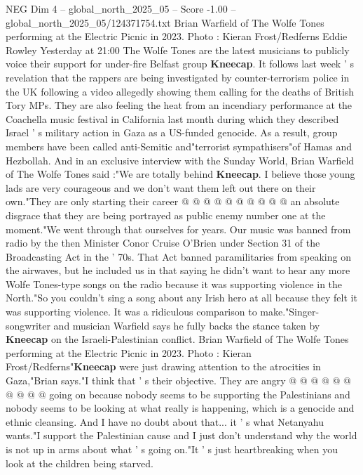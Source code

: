 \begin{textsample}{NEG Dim 4 – global\_north\_2025\_05 – Score -1.00 – global\_north\_2025\_05/124371754.txt}  \label{ex:f4_neg_263}
Brian Warfield of The Wolfe Tones performing at the Electric Picnic in 2023.
Photo : Kieran Frost/Redferns Eddie Rowley Yesterday at 21:00 The Wolfe Tones are the latest musicians to publicly voice their support for under-fire Belfast group \textbf{Kneecap}.
It follows last week ' s revelation that the rappers are being investigated by counter-terrorism police in the UK following a video allegedly showing them calling for the deaths of British Tory MPs.
They are also feeling the heat from an incendiary performance at the Coachella music festival in California last month during which they described Israel ' s military action in Gaza as a US-funded genocide.
As a result, group members have been called anti-Semitic and"terrorist sympathisers"of Hamas and Hezbollah.
And in an exclusive interview with the Sunday World, Brian Warfield of The Wolfe Tones said :"We are totally behind \textbf{Kneecap}.
I believe those young lads are very courageous and we don't want them left out there on their own."They are only starting their career @ @ @ @ @ @ @ @ @ @ an absolute disgrace that they are being portrayed as public enemy number one at the moment."We went through that ourselves for years.
Our music was banned from radio by the then Minister Conor Cruise O'Brien under Section 31 of the Broadcasting Act in the ' 70s.
That Act banned paramilitaries from speaking on the airwaves, but he included us in that saying he didn't want to hear any more Wolfe Tones-type songs on the radio because it was supporting violence in the North."So you couldn't sing a song about any Irish hero at all because they felt it was supporting violence.
It was a ridiculous comparison to make."Singer-songwriter and musician Warfield says he fully backs the stance taken by \textbf{Kneecap} on the Israeli-Palestinian conflict.
Brian Warfield of The Wolfe Tones performing at the Electric Picnic in 2023.
Photo : Kieran Frost/Redferns"\textbf{Kneecap} were just drawing attention to the atrocities in Gaza,"Brian says."I think that ' s their objective.
They are angry @ @ @ @ @ @ @ @ @ @ going on because nobody seems to be supporting the Palestinians and nobody seems to be looking at what really is happening, which is a genocide and ethnic cleansing.
And I have no doubt about that... it ' s what Netanyahu wants."I support the Palestinian cause and I just don't understand why the world is not up in arms about what ' s going on."It ' s just heartbreaking when you look at the children being starved.

\end{textsample}
